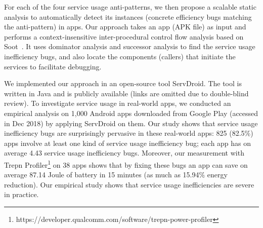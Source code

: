 \documentclass[sigconf,review, anonymous]{acmart}
\begin{document}
For each of the four service usage anti-patterns, we then propose a scalable
static analysis to automatically detect its instances (concrete efficiency
bugs matching the anti-pattern) in apps.
Our approach takes an app (APK file) as input and performs a context-insensitive
inter-procedural control flow analysis based on Soot~\cite{sootpaper}. It uses
dominator analysis and successor analysis to find the service usage inefficiency
bugs, and also locate the components (callers) that
initiate the services to facilitate debugging.

We implemented our approach in an open-source tool \textsf{ServDroid}. The tool
is written in Java and is publicly available (links are omitted due to double-blind review).
To investigate service usage in real-world apps, we
conducted an empirical analysis on 1,000 Android apps
downloaded from Google Play (accessed in Dec 2018) by applying \textsf{ServDroid} on them.
Our study shows that
service usage inefficiency bugs are surprisingly pervasive in these real-world
apps: 825 (82.5\%) apps involve at least one kind of service usage inefficiency
bug; each app has on average 4.43 service usage inefficiency bugs.
Moreover, our measurement with \textsf{Trepn Profiler}\footnote{https://developer.qualcomm.com/software/trepn-power-profiler} on 38 apps shows that by fixing these bugs an
app can save on average 87.14 Joule of battery in 15 minutes (as much as 15.94\%
energy reduction).
Our empirical study shows that service usage inefficiencies are severe in practice.

\end{document}
